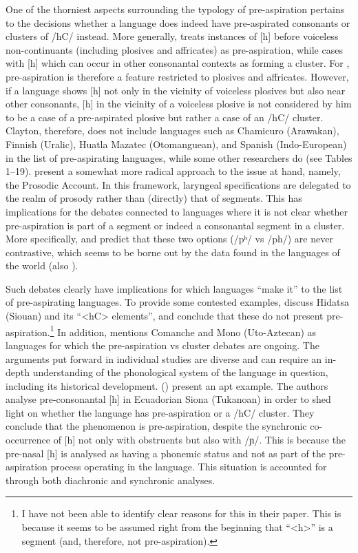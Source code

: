 \documentclass[output=paper]{langscibook}
\begin{document}
One of the thorniest aspects surrounding the typology of pre\hyp aspiration pertains to the decisions whether a language does indeed have pre-aspirated consonants or clusters of \mbox{/hC/} instead. More generally, \citet[9, 33]{Clayton2010} treats instances of [h] before voiceless non-continuants (including plosives and affricates) as pre-aspiration, while cases with [h] which can occur in other consonantal contexts as forming a cluster. For \citet[33]{Clayton2010}, pre\hyp aspiration is therefore a feature restricted to plosives and affricates. However, if a language shows [h] not only in the vicinity of voiceless plosives but also near other consonants, [h] in the vicinity of a voiceless plosive is not considered by him to be a case of a pre-aspirated plosive but rather a case of an \mbox{/hC/} cluster. Clayton, therefore, does not include languages such as Chamicuro (Arawakan), Finnish (Uralic), Huatla Mazatec (Otomanguean), and Spanish (Indo-European) in the list of pre-aspirating languages, while some other researchers do (see Tables 1--19). \citet{KehreinGolston2004} present a somewhat more radical approach to the issue at hand, namely, the Prosodic Account. In this framework, laryngeal specifications are delegated to the realm of prosody rather than (directly) that of segments. This has implications for the debates connected to languages where it is not clear whether pre\hyp aspiration is part of a segment or indeed a consonantal segment in a cluster. More specifically, \citet{KehreinGolston2004} and \textcite[90, 98, 100, 117, 213]{Kehrein2002} predict that these two options (/pʰ/ vs /ph/) are never contrastive, which seems to be borne out by the data found in the languages of the world (also \cites[79]{Steriade1992}{Steriade1994}).

Such debates clearly have implications for which languages “make it” to the list of pre-aspirating languages. To provide some contested examples, \citet[132]{TorresKasak2019} discuss Hidatsa (Siouan) and its “<hC> elements”, and conclude that these do not present pre-aspiration.\footnote{I have not been able to identify clear reasons for this in their paper. This is because it seems to be assumed right from the beginning that “<h>” is a segment (and, therefore, not pre-aspiration).} In addition, \citet[25]{Helgason2002} mentions Comanche and Mono (Uto-Aztecan) as languages for which the pre\hyp aspiration vs cluster debates are ongoing. The arguments put forward in individual studies are diverse and can require an in-depth understanding of the phonological system of the language in question, including its historical development.  (\citeyear{chapters/18_vantveer}) present an apt example. The authors analyse pre-consonantal [h] in Ecuadorian Siona (Tukanoan) in order to shed light on whether the language has pre\hyp aspiration or a /hC/ cluster. They conclude that the phenomenon is pre-aspiration, despite the synchronic co-occurrence of [h] not only with obstruents but also with /ɲ/. This is because the pre-nasal [h] is analysed as having a phonemic status and not as part of the pre\hyp aspiration process operating in the language. This situation is accounted for through both diachronic and synchronic analyses.
\end{document}
